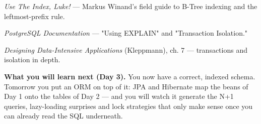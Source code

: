 \begin{wbitem}
  \item \emph{Use The Index, Luke!} --- Markus Winand's field guide to B-Tree indexing and the leftmost-prefix rule.
  \item \emph{PostgreSQL Documentation} --- "Using EXPLAIN" and "Transaction Isolation."
  \item \emph{Designing Data-Intensive Applications} (Kleppmann), ch. 7 --- transactions and isolation in depth.
\end{wbitem}

\begin{keyidea}
\textbf{What you will learn next (Day 3).} You now have a correct, indexed schema. Tomorrow you put an ORM on top of it: JPA and Hibernate map the beans of Day 1 onto the tables of Day 2 --- and you will watch it generate the N+1 queries, lazy-loading surprises and lock strategies that only make sense once you can already read the SQL underneath.
\end{keyidea}
